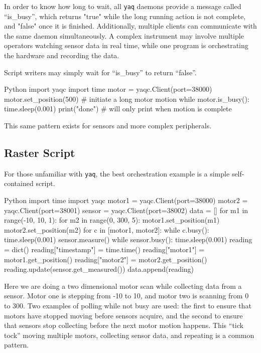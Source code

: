 \documentclass[11pt, full]{article}
\newcommand\yaq{\texttt{yaq}}
\begin{document}
In order to know how long to wait, all \yaq{} daemons provide a message called “is\_busy”, which returns "true" while the long running action is not complete, and "false" once it is finished.
Additionally, multiple clients can communicate with the same daemon simultaneously. A complex instrument may involve multiple operators watching sensor data in real time, while one program is orchestrating the hardware and recording the data.

Script writers may simply wait for ``is\_busy'' to return ``false''.

\begin{codefragment}{Python}
import yaqc
import time
motor = yaqc.Client(port=38000)
motor.set_position(500)  # initiate a long motor motion
while motor.is_busy():
    time.sleep(0.001)
print("done")  # will only print when motion is complete
\end{codefragment}

This same pattern exists for sensors and more complex peripherals.

\clearpage
\subsection{Raster Script}

For those unfamiliar with \yaq{}, the best orchestration example is a simple self-contained script.

\begin{codefragment}{Python}
import time
import yaqc
motor1 = yaqc.Client(port=38000)
motor2 = yaqc.Client(port=38001)
sensor = yaqc.Client(port=38002)
data = []
for m1 in range(-10, 10, 1):
    for m2 in range(0, 300, 5):
        motor1.set_position(m1)
        motor2.set_position(m2)
        for c in [motor1, motor2]:
            while c.busy():
                time.sleep(0.001)
        sensor.measure()
        while sensor.busy():
            time.sleep(0.001)
        reading = dict()
        reading["timestamp"] = time.time()
        reading["motor1"] = motor1.get_position()
        reading["motor2"] = motor2.get_position()
        reading.update(sensor.get_measured())
        data.append(reading)
\end{codefragment}

Here we are doing a two dimensional motor scan while collecting data from a sensor.
Motor one is stepping from -10 to 10, and motor two is scanning from 0 to 300.
Two examples of polling while not busy are used: the first to ensure that motors have stopped moving before sensors acquire, and the second to ensure that sensors stop collecting before the next motor motion happens.
This ``tick tock'' moving multiple motors, collecting sensor data, and repeating is a common pattern.
\end{document}
